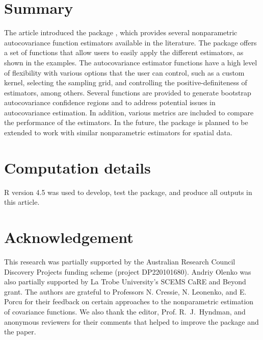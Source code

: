 \section{Summary}
The article introduced the package , which provides several nonparametric autocovariance function estimators available in the literature. The package offers a set of functions that allow users to easily apply the different estimators, as shown in the examples. The autocovariance estimator functions have a high level of flexibility with various options that the user can control, such as a custom kernel, selecting the sampling grid, and controlling the positive-definiteness of estimators, among others. Several functions are provided to generate bootstrap autocovariance confidence regions and to address potential issues in autocovariance estimation. In addition, various metrics are included to compare the performance of the estimators.
In the future, the package is planned to be extended to work with similar nonparametric estimators for spatial data.

\section{Computation details}
R version 4.5 was used to develop, test the package, and produce all outputs in this article.

\section{Acknowledgement}
This research was partially supported by the Australian Research Council Discovery Projects funding scheme (project DP220101680). Andriy Olenko was also partially supported by La Trobe University's SCEMS CaRE and Beyond grant. The authors are grateful to Professors N. Cressie, N. Leonenko, and E. Porcu for their feedback on certain approaches to the nonparametric estimation of covariance functions.
We also thank the editor, Prof. R.~J.~Hyndman, and anonymous reviewers for their comments that helped to improve the package and the paper.



\address{Adam Bilchouris\\
  Department of Mathematics and Statistics\\
  La Trobe University\\
  Australia\\
  ORCiD: 0009-0002-4649-0247\\
  }

\address{Andriy Olenko\\
  Department of Mathematics and Statistics\\
  La Trobe University\\
  Australia\\
  ORCiD: 0000-0002-0917-7000\\
  }
